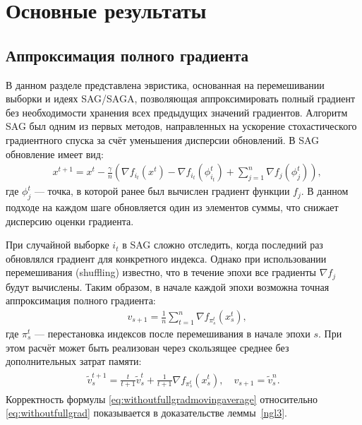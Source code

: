 \section{Основные результаты}\label{sec:main}

\subsection{Аппроксимация полного градиента}\label{subsection:gradientapprox}

В данном разделе представлена эвристика, основанная на перемешивании выборки и идеях \textsc{SAG/SAGA}, позволяющая аппроксимировать полный градиент без необходимости хранения всех предыдущих значений градиентов. Алгоритм \textsc{SAG} был одним из первых методов, направленных на ускорение стохастического градиентного спуска за счёт уменьшения дисперсии обновлений. В \textsc{SAG} обновление имеет вид:
\begin{align}\label{eq:sag}
    &\textstyle{x^{t+1} = x^t - \frac{\gamma}{n} \left( \nabla f_{i_t}(x^t) - \nabla f_{i_t}(\phi_{i_t}^t) +  \sum\limits_{j=1}^n \nabla f_j(\phi_j^t) \right),}
\end{align}
где \(\phi_j^t\) — точка, в которой ранее был вычислен градиент функции \(f_j\). В данном подходе на каждом шаге обновляется один из элементов суммы, что снижает дисперсию оценки градиента.

При случайной выборке \(i_t\) в \textsc{SAG} сложно отследить, когда последний раз обновлялся градиент для конкретного индекса. Однако при использовании перемешивания (shuffling) известно, что в течение эпохи все градиенты \(\nabla f_j\) будут вычислены. Таким образом, в начале каждой эпохи возможна точная аппроксимация полного градиента:
\begin{align} \label{eq:withoutfullgrad}
    &\textstyle{v_{s+1} = \frac{1}{n} \sum\limits_{t=1}^n \nabla f_{\pi_s^t}(x_s^t),}
\end{align}
где \(\pi_s^t\) — перестановка индексов после перемешивания в начале эпохи \(s\). При этом расчёт может быть реализован через скользящее среднее без дополнительных затрат памяти:
\begin{align}
\label{eq:withoutfullgradmovingaverage}
\begin{split}
    \textstyle{\widetilde{v}_s^{t+1}} = \textstyle{\frac{t}{t+1} \widetilde{v}_s^{t} + \frac{1}{t+1} \nabla f_{\pi_s^t}(x_s^t), \quad v_{s+1} = \widetilde{v}_s^n.}
\end{split}
\end{align}
Корректность формулы \eqref{eq:withoutfullgradmovingaverage} относительно \eqref{eq:withoutfullgrad} показывается в доказательстве леммы~\ref{ngl3}.

